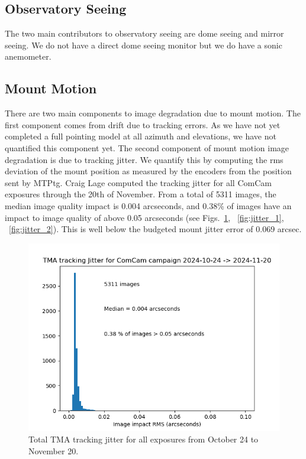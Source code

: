 \subsection{Observatory Seeing}

The two main contributors to observatory seeing are dome seeing and mirror seeing. We do not have a direct dome seeing monitor but we do have a sonic anemometer.

\subsection{Mount Motion}

There are two main components to image degradation due to mount motion. The first component comes from drift due to tracking errors. As we have not yet completed a full pointing model at all azimuth and elevations, we have not quantified this component yet. The second component of mount motion image degradation is due to tracking jitter. We quantify this by computing the rms deviation of the mount position as measured by the encoders from the position sent by MTPtg. Craig Lage computed the tracking jitter for all ComCam exposures through the 20th of November. From a total of 5311 images, the median image quality impact is 0.004 arcseconds, and 0.38\% of images have an impact to image quality of above 0.05 arcseconds (see Figs.~\ref{fig:jitter}, ~\ref{fig:jitter_1}, ~\ref{fig:jitter_2}). This is well below the budgeted mount jitter error of 0.069 arcsec.

\begin{figure}
  \includegraphics[width=\linewidth]{image_quality_figures/ComCam_Mount_Jitter_21Nov24.png}
  \caption{Total TMA tracking jitter for all exposures from October 24 to November 20.}
  \label{fig:jitter}
\end{figure}


